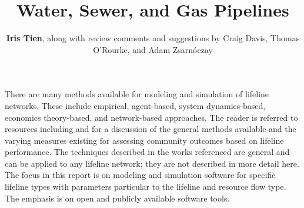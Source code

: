 %
%
%

\title{Water, Sewer, and Gas Pipelines}
\author{
    \textbf{Iris Tien},
    \newline
    along with review comments and suggestions by Craig Davis, Thomas O'Rourke, and Adam Zsarnóczay
}
\tocauthor{}
%
%
\maketitle
\label{chapter:perf_pipe}

There are many methods available for modeling and simulation of lifeline networks. These include empirical, agent-based, system dynamics-based, economics theory-based, and network-based approaches. The reader is referred to resources including \citet{ouyang2014review} and \citet{johansen2017metrics} for a discussion of the general methods available and the varying measures existing for assessing community outcomes based on lifeline performance. The techniques described in the works referenced are general and can be applied to any lifeline network; they are not described in more detail here. The focus in this report is on modeling and simulation software for specific lifeline types with parameters particular to the lifeline and resource flow type. The emphasis is on open and publicly available software tools.

